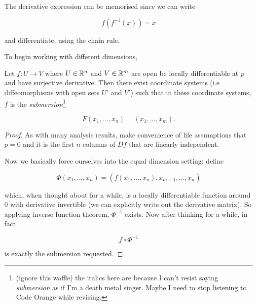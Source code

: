 \documentclass[11pt]{scrartcl}
\begin{document}
\begin{remark}
The derivative expression can be memorised since we can write

\begin{equation}
    f(f^{-1}(x)) = x
\end{equation}

and differentiate, using the chain rule.
\end{remark}

To begin working with different dimensions,

\begin{theorem}
Let $f : U \rightarrow V$ where $U \in \mathbb R^n$ and $V \in \mathbb R^m$ are open be locally differentiable at $p$ and have surjective derivative. Then there exist coordinate systems (i.e diffeomorphisms with open sets $U'$ and $V'$) such that in these coordinate systems, $f$ is the \textit{submersion}\footnote{(ignore this waffle) the italics here are because I can't resist saying \textit{submersion} as if I'm a death metal singer. Maybe I need to stop listening to Code Orange while revising.}

\begin{equation}
F(x_1, ... , x_n) = (x_1, ... , x_m).    
\end{equation}

\begin{proof}
As with many analysis results, make convenience of life assumptions that $p=0$ and it is the first $n$ columns of $Df$ that are linearly independent. 

Now we basically force ourselves into the equal dimension setting: define

\begin{equation}
    \Phi(x_1, ... , x_n) = (f(x_1, ... , x_n), x_{m+1}, ... , x_n)
\end{equation}

which, when thought about for a while, is a locally differentiable function around 0 with derivative invertible (we can explicitly write out the derivative matrix). So applying inverse function theorem, $\Phi^{-1}$ exists. Now after thinking for a while, in fact 

\begin{equation}
    f \circ \Phi^{-1}
\end{equation}

is exactly the submersion requested.
\end{proof}
\end{theorem}
\end{document}
